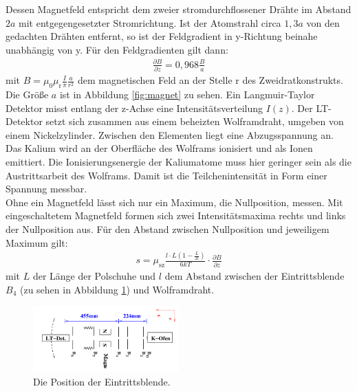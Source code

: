 Dessen Magnetfeld entspricht dem zweier stromdurchflossener Drähte im Abstand $2a$
mit entgegengesetzter Stromrichtung.
Ist der Atomstrahl circa $1,3a$ von den gedachten Drähten entfernt, so ist
der Feldgradient in y-Richtung beinahe unabhängig von y.
Für den Feldgradienten gilt dann:
\begin{align}
  \frac{\partial B}{\partial z}=0,968\frac{B}{a}
\end{align}
mit $B=\mu_\mathrm{0}\mu_\mathrm{r}\frac{I}{\pi}\frac{a}{r^2}$ dem magnetischen
Feld an der Stelle r des Zweidratkonstrukts. Die Größe $a$ ist in Abbildung \ref{fig:magnet} zu sehen.
Ein Langmuir-Taylor Detektor misst entlang der z-Achse eine Intensitätsverteilung $I(z)$.
Der LT-Detektor setzt sich zusammen aus einem beheizten Wolframdraht, umgeben
von einem Nickelzylinder. Zwischen den Elementen liegt eine Abzugsspannung an.
Das Kalium wird an der Oberfläche des Wolframs
ionisiert und als Ionen emittiert. Die Ionisierungsenergie der Kaliumatome
muss hier geringer sein als die Austrittsarbeit des Wolframs.
Damit ist die Teilchenintensität in Form einer Spannung messbar.\\
Ohne ein Magnetfeld lässt sich nur ein
Maximum, die Nullposition, messen. Mit eingeschaltetem Magnetfeld formen sich zwei Intensitätsmaxima
rechts und links der Nullposition aus.
Für den Abstand zwischen Nullposition und jeweiligem Maximum gilt:
\begin{align}
 s=\mu_\mathrm{sz}\frac{l\cdot L\left(1-\frac{L}{2l}\right)}{6kT}\cdot\frac{\partial B}{\partial z} \label{eqn:abstand}
\end{align}
mit $L$ der Länge der Polschuhe und $l$ dem Abstand zwischen
der Eintrittsblende $B_\mathrm{4}$ (zu sehen in Abbildung \ref{fig:schema}) und Wolframdraht.
\begin{figure}
   \centering
    \includegraphics[width=0.5\textwidth]{schema.PNG}
    \caption{Die Position der Eintrittsblende.\cite{skript}}
    \label{fig:schema}
    \FloatBarrier
\end{figure}
